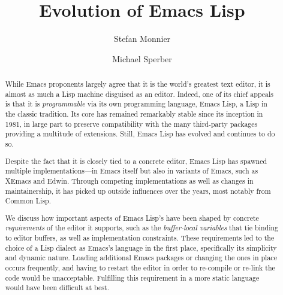 \documentclass[format=acmsmall, review=false, screen=true]{acmart}
\begin{document}
\title{Evolution of Emacs Lisp}

\author{Stefan Monnier}
\author{Michael Sperber}


\begin{abstract}
  While Emacs proponents largely agree that it is the world's greatest text
  editor, it is almost as much a Lisp machine disguised as an editor.
  Indeed, one of its chief appeals is that it is \emph{programmable} via
  its own programming language, Emacs Lisp, a Lisp in the classic
  tradition.  Its core has remained remarkably stable since its
  inception in 1981, in large part to preserve compatibility with the many
  third-party packages providing a multitude of extensions.
  Still, Emacs Lisp has evolved and continues to do so.

  Despite the fact that it is closely tied to a concrete editor, Emacs
  Lisp has spawned multiple implementations---in Emacs itself but also
  in variants of Emacs, such as XEmacs and Edwin.  Through competing
  implementations as well as changes in maintainership, it has picked
  up outside influences over the years, most notably from Common Lisp.

  We discuss how important aspects of Emacs Lisp's have been shaped by
  concrete \emph{requirements} of the editor it supports, such as
  the \textit{buffer-local variables} that tie binding to
  editor buffers, as well as implementation constraints.
  These requirements led to the choice of a Lisp dialect as Emacs's
  language in the first place, specifically its simplicity and dynamic nature.
  Loading additional Emacs packages or changing the ones in place
  occurs frequently, and having to restart the editor in order to
  re-compile or re-link the code would be unacceptable.  Fulfilling
  this requirement in a more static language would have been difficult
  at best.


\end{abstract}
\end{document}
